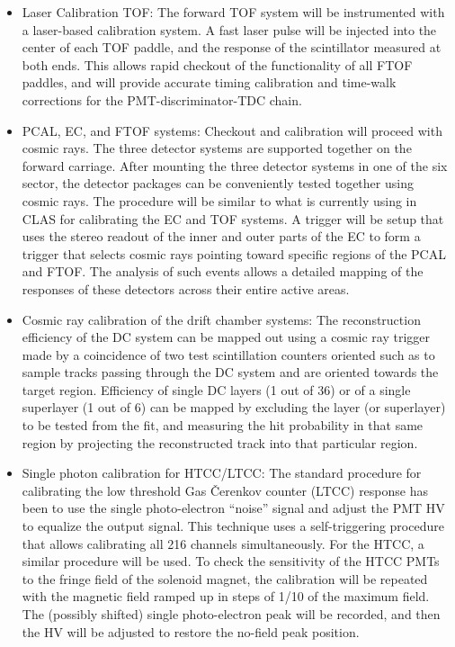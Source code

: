 \begin{itemize}
\item Laser Calibration TOF: The forward TOF system will be instrumented
with a laser-based calibration system.  A fast laser pulse will be
injected into the center of each TOF paddle, and the response of the
scintillator measured at both ends.  This allows rapid checkout of the
functionality of all FTOF paddles, and will provide accurate timing
calibration and time-walk corrections for the PMT-discriminator-TDC
chain.

\item PCAL, EC, and FTOF systems: Checkout and calibration will proceed
with cosmic rays.  The three detector systems are supported together
on the forward carriage.  After mounting the three detector systems in
one of the six sector, the detector packages can be conveniently tested
together using cosmic rays.  The procedure will be similar to what is
currently using in CLAS for calibrating the EC and TOF systems.  A
trigger will be setup that uses the stereo readout of the inner and outer
parts of the EC to form a trigger that selects cosmic rays pointing
toward specific regions of the PCAL and FTOF.  The analysis of such
events allows a detailed mapping of the responses of these detectors
across their entire active areas.

\item Cosmic ray calibration of the drift chamber systems: The
reconstruction efficiency of the DC system can be mapped out using
a cosmic ray trigger made by a coincidence of two test scintillation
counters oriented such as to sample tracks passing through the DC
system and are oriented towards the target region.  Efficiency of
single DC layers (1 out of 36) or of a single superlayer (1 out of 6) can
be mapped by excluding the layer (or superlayer) to be tested from the
fit, and measuring the hit probability in that same region by
projecting the reconstructed track into that particular region.

\item Single photon calibration for HTCC/LTCC: The standard procedure for 
calibrating the low threshold Gas {\v C}erenkov counter (LTCC) response has 
been to use the single photo-electron ``noise'' signal and adjust the PMT 
HV to equalize the output signal.  This technique uses a self-triggering 
procedure that allows calibrating all 216 channels simultaneously.  For 
the HTCC, a similar procedure will be used.  To check the sensitivity of 
the HTCC PMTs to the fringe field of the solenoid magnet, the calibration 
will be repeated with the magnetic field ramped up in steps of 1/10 of the 
maximum field.  The (possibly shifted) single photo-electron peak will be 
recorded, and then the HV will be adjusted to restore the no-field peak 
position.   


\end{itemize}
